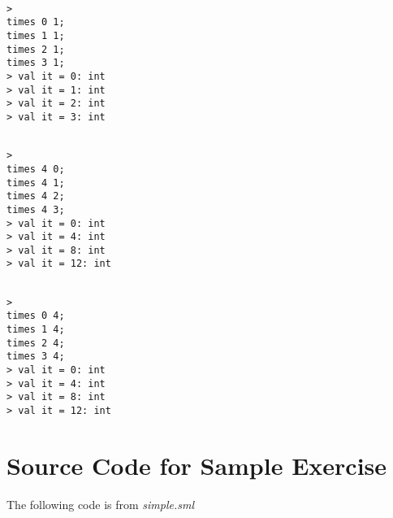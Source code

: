 \documentclass{report}
\begin{document}
\begin{session}
  \begin{scriptsize}
\begin{verbatim}

> 
times 0 1;
times 1 1;
times 2 1;
times 3 1;
> val it = 0: int
> val it = 1: int
> val it = 2: int
> val it = 3: int
\end{verbatim}
  \end{scriptsize}
\end{session}

\begin{session}
  \begin{scriptsize}
\begin{verbatim}

> 
times 4 0;
times 4 1;
times 4 2;
times 4 3;
> val it = 0: int
> val it = 4: int
> val it = 8: int
> val it = 12: int
\end{verbatim}
  \end{scriptsize}
\end{session}

\begin{session}
  \begin{scriptsize}
\begin{verbatim}

> 
times 0 4;
times 1 4;
times 2 4;
times 3 4;
> val it = 0: int
> val it = 4: int
> val it = 8: int
> val it = 12: int
\end{verbatim}
  \end{scriptsize}
\end{session}


\appendix{} 


\chapter{Source Code for Sample Exercise}
\label{cha:source-code-sample}

The following code is from \emph{simple.sml}

\end{document}
